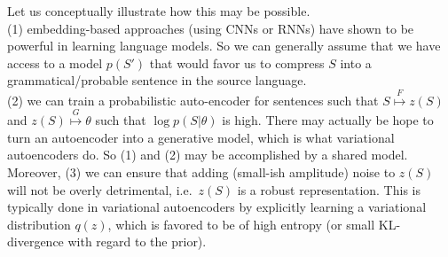 \documentclass{article}
\begin{document}
\newpage



Let us conceptually illustrate how this may be possible.\\[2mm]
(1) embedding-based approaches (using CNNs or RNNs) have shown to be powerful in learning language models. So we can generally assume that we have access to a model $p(S')$ that would  favor us to compress $S$ into a grammatical/probable sentence in the source language.\\[2mm]
(2) we can train a probabilistic auto-encoder for sentences such that $S \stackrel F \mapsto z(S)$ and $z(S) \stackrel G \mapsto \theta$ such that $\log p(S| \theta)$ is high.   There may actually be hope to turn an autoencoder into a generative model, which is what variational autoencoders do. So (1) and (2) may be accomplished by a shared model. \\[2mm]
Moreover, (3) we can ensure that adding (small-ish amplitude) noise to $z(S)$ will not be overly detrimental, i.e.~$z(S)$ is a robust representation. This is typically done in variational autoencoders by explicitly learning a variational distribution $q(z)$, which is favored to be of high entropy (or small KL-divergence with regard to the prior). \\[2mm]
\end{document}
